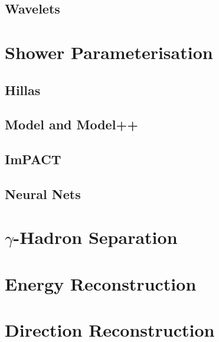 \subsection{Wavelets}

\section{Shower Parameterisation}

\subsection{Hillas}

\subsection{Model and Model++}

\subsection{ImPACT}

\subsection{Neural Nets}

\section{$\gamma$-Hadron Separation}

\section{Energy Reconstruction}

\section{Direction Reconstruction}



